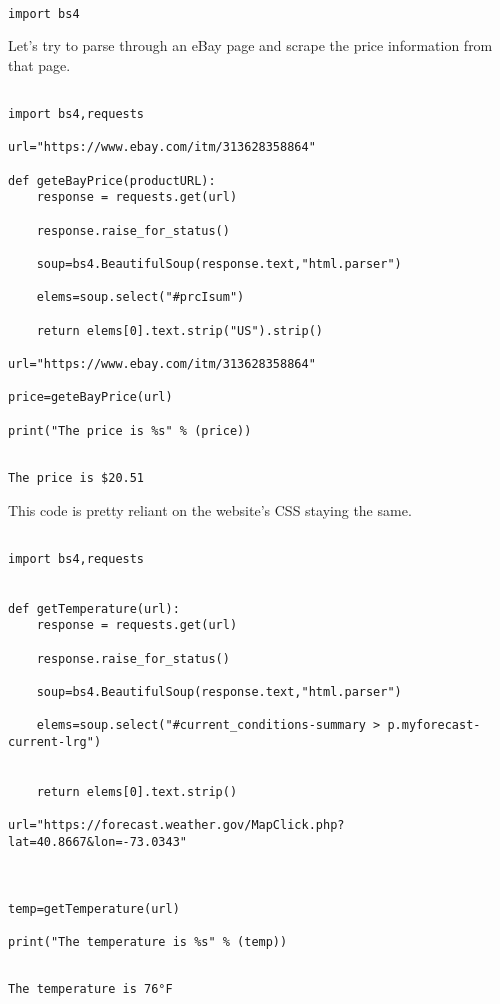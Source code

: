 \documentclass[11pt]{article}
\begin{document}
\begin{verbatim}

import bs4

\end{verbatim}

Let's try to parse through an eBay page and scrape the price information from that page.

\begin{verbatim}

import bs4,requests

url="https://www.ebay.com/itm/313628358864"

def geteBayPrice(productURL):
    response = requests.get(url)

    response.raise_for_status()

    soup=bs4.BeautifulSoup(response.text,"html.parser")

    elems=soup.select("#prcIsum")

    return elems[0].text.strip("US").strip()

url="https://www.ebay.com/itm/313628358864"

price=geteBayPrice(url)

print("The price is %s" % (price))
    
\end{verbatim}

\begin{verbatim}
The price is $20.51
\end{verbatim}


This code is pretty reliant on the website's CSS staying the same.

\begin{verbatim}

import bs4,requests


def getTemperature(url):
    response = requests.get(url)

    response.raise_for_status()

    soup=bs4.BeautifulSoup(response.text,"html.parser")

    elems=soup.select("#current_conditions-summary > p.myforecast-current-lrg")
    

    return elems[0].text.strip()

url="https://forecast.weather.gov/MapClick.php?lat=40.8667&lon=-73.0343"



temp=getTemperature(url)

print("The temperature is %s" % (temp))
    
\end{verbatim}

\begin{verbatim}
The temperature is 76°F
\end{verbatim}
\end{document}

